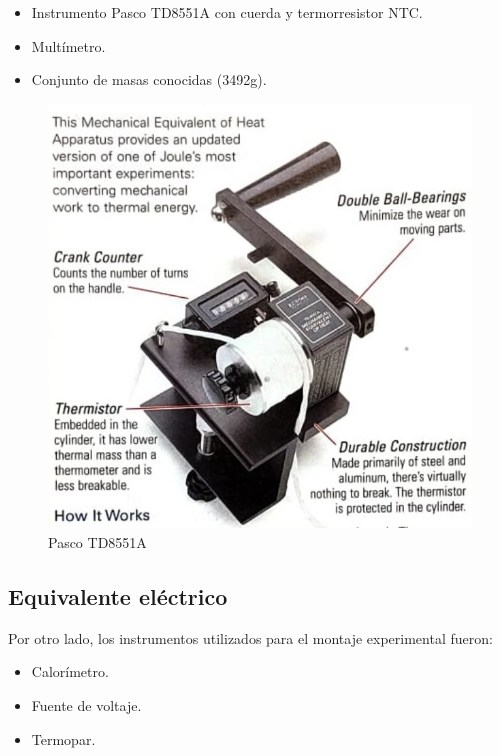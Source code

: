 \documentclass{article}
\begin{document}
 \begin{itemize}
 \item Instrumento Pasco TD8551A con cuerda y termorresistor NTC.
 \item Multímetro.
 \item Conjunto de masas conocidas (3492g).
 \end{itemize}

\begin{figure}[H]
    \centering
    \includegraphics[scale=0.25]{pasco.png}
    \caption{Pasco TD8551A}
    \label{fig:pasco}
\end{figure}

\subsection{Equivalente eléctrico}
Por otro lado, los instrumentos utilizados para el montaje experimental fueron:

\begin{itemize}
    \item Calorímetro.
    \item Fuente de voltaje.
    \item Termopar. 
\end{itemize}
\end{document}
